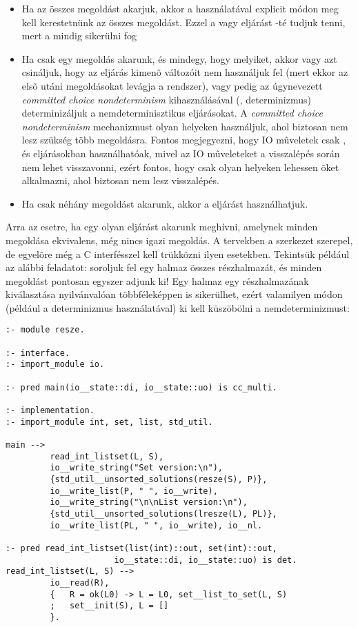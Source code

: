 \begin{itemize}
\item Ha az összes megoldást akarjuk, akkor a  használatával
explicit módon meg kell kerestetnünk az összes megoldást. Ezzel a  vagy
 eljárást -té tudjuk tenni, mert a  mindig
sikerülni fog
\item Ha csak egy megoldás akarunk, és mindegy, hogy melyiket, akkor vagy azt csináljuk,
hogy az eljárás kimenõ változóit nem használjuk fel (mert ekkor az elsõ utáni megoldásokat
levágja a rendszer), vagy pedig az úgynevezett \emph{committed choice nondeterminism}
kihasználásával (,  determinizmus) determinizáljuk a
nemdeterminisztikus eljárásokat. A \emph{committed choice nondeterminism} mechanizmust
olyan helyeken használjuk, ahol biztosan nem lesz szükség több megoldásra. Fontos
megjegyezni, hogy IO mûveletek csak ,  és 
eljárásokban használhatóak, mivel az IO mûveleteket a visszalépés során nem lehet
visszavonni, ezért fontos, hogy csak olyan helyeken lehessen õket alkalmazni, ahol
biztosan nem lesz visszalépés.
\item Ha csak néhány megoldást akarunk, akkor a  eljárást
használhatjuk.
\end{itemize}

Arra az esetre, ha egy olyan eljárást akarunk meghívni, amelynek minden megoldása
ekvivalens, még nincs igazi megoldás. A tervekben a  szerkezet
szerepel, de egyelõre még a C interfésszel kell trükközni ilyen esetekben.
\br
Tekintsük például az alábbi feladatot: soroljuk fel egy halmaz összes részhalmazát,
és minden megoldást pontosan egyszer adjunk ki! Egy halmaz egy részhalmazának
kiválasztása nyilvánvalóan többféleképpen is sikerülhet, ezért valamilyen módon
(például a  determinizmus használatával) ki kell küszöbölni a
nemdeterminizmust:

\begin{verbatim}
:- module resze.

:- interface.
:- import_module io.

:- pred main(io__state::di, io__state::uo) is cc_multi.

:- implementation.
:- import_module int, set, list, std_util.

main -->
         read_int_listset(L, S),
         io__write_string("Set version:\n"),
         {std_util__unsorted_solutions(resze(S), P)},
         io__write_list(P, " ", io__write),
         io__write_string("\n\nList version:\n"),
         {std_util__unsorted_solutions(lresze(L), PL)},
         io__write_list(PL, " ", io__write), io__nl.

:- pred read_int_listset(list(int)::out, set(int)::out,
                      io__state::di, io__state::uo) is det.
read_int_listset(L, S) -->
         io__read(R),
         {   R = ok(L0) -> L = L0, set__list_to_set(L, S)
         ;   set__init(S), L = []
         }.
\end{verbatim}

